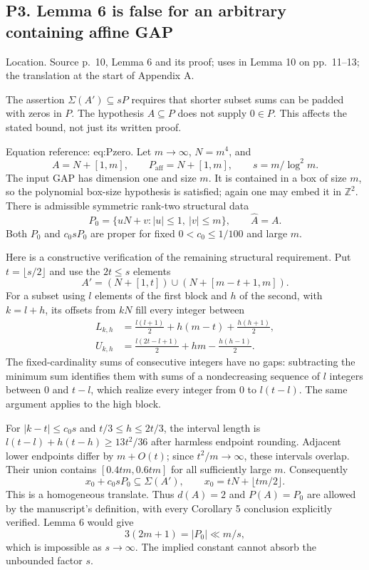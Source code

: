 \documentclass[10pt]{article}
\begin{document}
\subsection*{P3. Lemma 6 is false for an arbitrary containing affine GAP}
Location. Source p. 10, Lemma 6 and its proof; uses in Lemma 10 on pp. 11–13; the translation at the start of Appendix A.\par
The assertion \(\Sigma(A')\subseteq sP\) requires that shorter subset sums can be padded with zeros in \(P\). The hypothesis \(A\subseteq P\) does not supply \(0\in P\). This affects the stated bound, not just its written proof.\par
Equation reference: eq:Pzero. Let \(m\to\infty\), \(N=m^4\), and \[A=N+[1,m],\qquad P_{\mathrm{aff}}=N+[1,m],\qquad
 s=m/\log^2m.\] The input GAP has dimension one and size \(m\). It is contained in a box of size \(m\), so the polynomial box-size hypothesis is satisfied; again one may embed it in \(\mathbb Z^2\). There is admissible symmetric rank-two structural data \[
 P_0=\{uN+v: |u|\le1,\ |v|\le m\},\qquad \widehat A=A.\] Both \(P_0\) and \(c_0sP_0\) are proper for fixed \(0<c_0\le1/100\) and large \(m\).\par
Here is a constructive verification of the remaining structural requirement. Put \(t=\lfloor s/2\rfloor\) and use the \(2t\le s\) elements \[A'=(N+[1,t])\cup(N+[m-t+1,m]).\] For a subset using \(l\) elements of the first block and \(h\) of the second, with \(k=l+h\), its offsets from \(kN\) fill every integer between \[\begin{aligned}
 L_{k,h}&=\frac{l(l+1)}2+h(m-t)+\frac{h(h+1)}2,\\
 U_{k,h}&=\frac{l(2t-l+1)}2+hm-\frac{h(h-1)}2.\end{aligned}\] The fixed-cardinality sums of consecutive integers have no gaps: subtracting the minimum sum identifies them with sums of a nondecreasing sequence of \(l\) integers between \(0\) and \(t-l\), which realize every integer from \(0\) to \(l(t-l)\). The same argument applies to the high block.\par
For \(|k-t|\le c_0s\) and \(t/3\le h\le2t/3\), the interval length is \(l(t-l)+h(t-h)\ge13t^2/36\) after harmless endpoint rounding. Adjacent lower endpoints differ by \(m+O(t)\); since \(t^2/m\to\infty\), these intervals overlap. Their union contains \([0.4tm,0.6tm]\) for all sufficiently large \(m\). Consequently \[x_0+c_0sP_0\subseteq\Sigma(A'),\qquad
 x_0=tN+\lfloor tm/2\rfloor.\] This is a homogeneous translate. Thus \(d(A)=2\) and \(P(A)=P_0\) are allowed by the manuscript’s definition, with every Corollary 5 conclusion explicitly verified. Lemma 6 would give \[3(2m+1)=|P_0|\ll m/s,\] which is impossible as \(s\to\infty\). The implied constant cannot absorb the unbounded factor \(s\).\par
\end{document}
